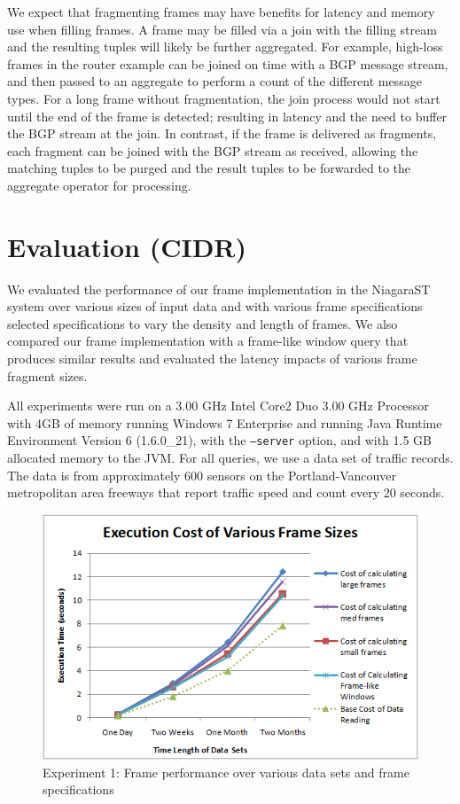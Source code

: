 \documentclass{vldb}
\begin{document}
\begin{appendix}
We expect that fragmenting frames may have benefits for latency and memory use when filling frames. A frame may be filled via a join with the filling stream and the resulting tuples will likely be further aggregated. For example, high-loss frames in the router example can be joined on time with a BGP message stream, and then passed to an aggregate to perform a count of the different message types. For a long frame without fragmentation, the join process would not start until the end of the frame is detected; resulting in latency and the need to buffer the BGP stream at the join. In contrast, if the frame is delivered as fragments, each fragment can be joined with the BGP stream as received, allowing the matching tuples to be purged and the result tuples to be forwarded to the aggregate operator for processing.

\section{Evaluation (CIDR)}
\label{sec:evaluation-cidr}

We evaluated the performance of our frame implementation in the NiagaraST system over various sizes of input data and with various frame specifications selected specifications to vary the density and length of frames. We also compared our frame implementation with a frame-like window query that produces similar results and evaluated the latency impacts of various frame fragment sizes. 

All experiments were run on a 3.00 GHz Intel Core2 Duo 3.00 GHz Processor with 4GB of memory running Windows 7 Enterprise and running Java Runtime Environment Version 6 (1.6.0\_21), with the \texttt{–server} option, and with 1.5 GB allocated memory to the JVM. For all queries, we use a data set of traffic records. The data is from approximately 600 sensors on the Portland-Vancouver metropolitan area freeways that report traffic speed and count every 20 seconds.

\begin{figure}[htb]
   \centering
   \includegraphics[width=.99\columnwidth]{figures/eval-experiment-1}
   \caption{Experiment 1: Frame performance over various data sets and frame specifications}
   \label{fig:eval-experiment-1}
\end{figure}


\end{appendix}
\end{document}
